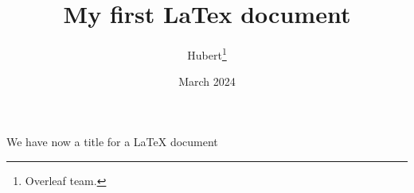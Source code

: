 \documentclass[12pt, letterpaper]{article}
\title{My first LaTex document}
\author{Hubert\thanks{Overleaf team.}}
\date{March 2024}
\begin{document}
\maketitle
We have now a title for a \LaTeX{} document
\end{document}
